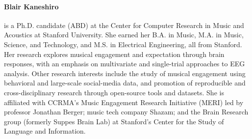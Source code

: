 {\paragraph{Blair Kaneshiro} is a Ph.D. candidate (ABD) at the Center for Computer Research in Music and Acoustics at Stanford University. She earned her B.A. in Music, M.A. in Music, Science, and Technology, and M.S. in Electrical Engineering, all from Stanford. Her research explores musical engagement and expectation through brain responses, with an emphasis on multivariate and single-trial approaches to EEG analysis. Other research interests include the study of musical engagement using behavioral and large-scale social-media data, and promotion of reproducible and cross-disciplinary research through open-source tools and datasets. She is affiliated with CCRMA’s Music Engagement Research Initiative (MERI) led by professor Jonathan Berger; music tech company Shazam; and the Brain Research group (formerly Suppes Brain Lab) at Stanford’s Center for the Study of Language and Information.}

